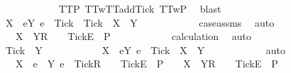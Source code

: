 \begin{isabellebody}
\ \ \ \ \ \ \ \ \ \ \isamarkupfalse%
\ TT{}{\isacharunderscore}P\ TT{}w{\isacharunderscore}TT{}{\isacharunderscore}add{\isacharunderscore}Tick\ TT{}w{\isacharunderscore}P\ \isamarkupfalse%
\ blast\isanewline
\ \ \ \ \ \ \ \ \isamarkupfalse%
\ \isamarkupfalse%
\ {\isachardoublequoteopen}X\ {\isasymunion}\ {\isacharbraceleft}e{\isasymin}Y{\isachardot}\ e\ {\isasymnoteq}\ Tick{\isacharbraceright}\ {\isasymunion}\ {\isacharbraceleft}Tick{\isacharbraceright}\ {\isacharequal}\ X\ {\isasymunion}\ Y{\isachardoublequoteclose}\isanewline
\ \ \ \ \ \ \ \ \ \ \isamarkupfalse%
\ case{\isacharunderscore}assms{}{\isacharparenleft}{}{\isacharparenright}\ \isamarkupfalse%
\ auto\isanewline
\ \ \ \ \ \ \ \ \isamarkupfalse%
\ \isamarkupfalse%
\ {\isachardoublequoteopen}{\isasymrho}\ {\isacharat}\ {\isacharbrackleft}X\ {\isasymunion}\ Y{\isacharbrackright}\isactrlsub R\ {\isacharhash}\ {\isasymsigma}{\isacharprime}\ {\isacharat}\ {\isacharbrackleft}{\isacharbrackleft}Tick{\isacharbrackright}\isactrlsub E{\isacharbrackright}\ {\isasymin}\ P{\isachardoublequoteclose}\isanewline
\ \ \ \ \ \ \ \ \ \ \isamarkupfalse%
\ calculation\ \isamarkupfalse%
\ auto\isanewline
\ \ \ \ \ \ \isamarkupfalse%
\isanewline
\ \ \ \ \ \ \ \ \isamarkupfalse%
\ {\isachardoublequoteopen}Tick\ {\isasymnotin}\ Y{\isachardoublequoteclose}\isanewline
\ \ \ \ \ \ \ \ \isamarkupfalse%
\ \isamarkupfalse%
\ {\isachardoublequoteopen}X\ {\isasymunion}\ {\isacharbraceleft}e{\isasymin}Y{\isachardot}\ e\ {\isasymnoteq}\ Tick{\isacharbraceright}\ {\isacharequal}\ X\ {\isasymunion}\ Y{\isachardoublequoteclose}\isanewline
\ \ \ \ \ \ \ \ \ \ \isamarkupfalse%
\ auto\isanewline
\ \ \ \ \ \ \ \ \isamarkupfalse%
\ \isamarkupfalse%
\ {\isachardoublequoteopen}{\isasymrho}\ {\isacharat}\ {\isacharbrackleft}X\ {\isasymunion}\ {\isacharbraceleft}e\ {\isasymin}\ Y{\isachardot}\ e\ {\isasymnoteq}\ Tick{\isacharbraceright}{\isacharbrackright}\isactrlsub R\ {\isacharhash}\ {\isasymsigma}{\isacharprime}\ {\isacharat}\ {\isacharbrackleft}{\isacharbrackleft}Tick{\isacharbrackright}\isactrlsub E{\isacharbrackright}\ {\isasymin}\ P\ {\isasymLongrightarrow}\ {\isasymrho}\ {\isacharat}\ {\isacharbrackleft}X\ {\isasymunion}\ Y{\isacharbrackright}\isactrlsub R\ {\isacharhash}\ {\isasymsigma}{\isacharprime}\ {\isacharat}\ {\isacharbrackleft}{\isacharbrackleft}Tick{\isacharbrackright}\isactrlsub E{\isacharbrackright}\ {\isasymin}\ P{\isachardoublequoteclose}\isanewline

\end{isabellebody}
